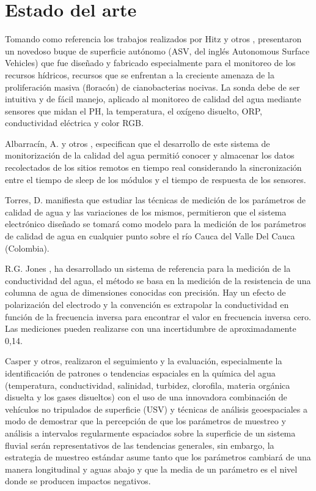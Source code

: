 \section{Estado del arte}


Tomando como referencia los trabajos realizados por Hitz y otros \cite{hitz2012design}, presentaron un novedoso buque de superficie autónomo (ASV, del ingl\'es Autonomous Surface Vehicles) que fue dise\~nado y fabricado especialmente para el monitoreo de los recursos h\'idricos, recursos que se enfrentan a la creciente amenaza de la proliferaci\'on masiva (florac\'on) de cianobacterias nocivas. La sonda debe de ser intuitiva y de f\'acil manejo, aplicado al monitoreo de calidad del agua mediante sensores que midan el PH, la temperatura, el ox\'igeno disuelto,  ORP, conductividad el\'ectrica y color RGB. 

Albarrac\'in, A. y otros \cite{samaniegodevelopment}, especifican que el desarrollo de este sistema de monitorizaci\'on de la calidad del agua permiti\'o conocer y almacenar los datos recolectados de los sitios remotos en tiempo real considerando la sincronizaci\'on entre el tiempo de sleep de los m\'odulos y el tiempo de respuesta de los sensores. 

Torres, D. \cite{torres2009diseno} manifiesta que estudiar las t\'ecnicas de medici\'on de los par\'ametros de calidad de agua y las variaciones de los mismos, permitieron que el sistema electr\'onico dise\~nado se tomar\'a como modelo para la medici\'on de los par\'ametros de calidad de agua en cualquier punto sobre el río Cauca del Valle Del Cauca (Colombia).

R.G. Jones \cite{jones2002measurements}, ha desarrollado un sistema de referencia para la medici\'on de la conductividad del agua, el m\'etodo se basa en la medici\'on de la resistencia de una columna de agua de dimensiones conocidas con precisión. Hay un efecto de polarización del electrodo y la convención es extrapolar la conductividad en funci\'on de la frecuencia inversa para encontrar el valor en frecuencia inversa cero. Las mediciones pueden realizarse con una incertidumbre de aproximadamente 0,14.

Casper y otros\cite{casper2007combining}, realizaron el seguimiento y la evaluaci\'on, especialmente la identificaci\'on de patrones o tendencias espaciales en la qu\'imica del agua (temperatura, conductividad, salinidad, turbidez, clorofila, materia org\'anica disuelta y los gases disueltos) con el uso de una innovadora combinaci\'on de veh\'iculos no tripulados de superficie (USV) y t\'ecnicas de an\'alisis geoespaciales a modo de demostrar que la percepci\'on de que los par\'ametros de muestreo y an\'alisis a intervalos regularmente espaciados sobre la superficie de un sistema fluvial ser\'an representativos de las tendencias generales, sin embargo, la estrategia de muestreo est\'andar asume tanto que los par\'ametros cambiar\'a de una manera longitudinal y aguas abajo y que la media de un par\'ametro es el nivel donde se producen impactos negativos. 

